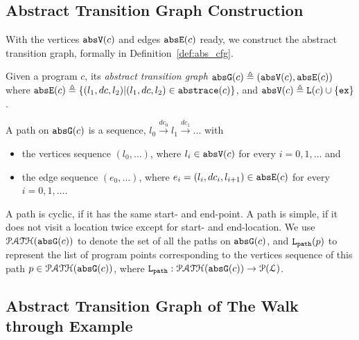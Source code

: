 \subsection{Abstract Transition Graph Construction} 
With the vertices $\mathtt{abs}{\mathtt{V}}(c)$ and edges $\mathtt{abs}{\mathtt{E}}(c)$ ready, we construct the abstract transition graph, formally in
Definition~\ref{def:abs_cfg}.
%
\begin{defn}
\label{def:abs_cfg}
Given a program $c$, 
its \emph{abstract transition graph} $\mathtt{abs}{\mathtt{G}}(c) \triangleq (\mathtt{abs}{\mathtt{V}}(c), \mathtt{abs}{\mathtt{E}}(c))$ where
$\mathtt{abs}{\mathtt{E}}(c) \triangleq \{(l_1, dc, l_2) | (l_1, dc, l_2) \in \mathtt{abs}{\mathtt{trace}}(c)\}$,
and
$\mathtt{abs}{\mathtt{V}}(c) \triangleq \mathtt{L}(c)\cup\{\mathtt{ex}\}$.

A path on $\mathtt{abs}{\mathtt{G}}(c)$ is a sequence, $ l_0 \xrightarrow{dc_0} l_1 \xrightarrow{dc_1} \ldots $ with
\begin{itemize}
\item the vertices sequence $(l_0, \ldots)$, where $l_i \in \mathtt{abs}{\mathtt{V}}(c)$ for every $i = 0, 1, \ldots$ and
%
\item the edge sequence $(e_0, \ldots)$, where $e_i = (l_{i}, dc_i, l_{i + 1}) \in \mathtt{abs}{\mathtt{E}}(c)$ for every $i = 0, 1, \ldots$.
\end{itemize}
A path is cyclic, if it has the same start- and end-point. A path is simple, if it does not visit a location twice except for start- and end-location. We use $\mathcal{PATH}(\mathtt{abs}{\mathtt{G}}(c))$ to denote the set of all the paths on $\mathtt{abs}{\mathtt{G}}(c)$,
and $\mathtt{L}_{\mathtt{path}}(p)$ to represent the list of program points corresponding to the vertices sequence of this path $p \in \mathcal{PATH}(\mathtt{abs}{\mathtt{G}}(c))$,
where $\mathtt{L}_{\mathtt{path}} : \mathcal{PATH}(\mathtt{abs}{\mathtt{G}}(c)) \to \mathcal{P}{(\mathcal{L})}$.
\end{defn}
\subsection{Abstract Transition Graph of The Walk through Example}
\label{sec:abs_prog_example}
% 
